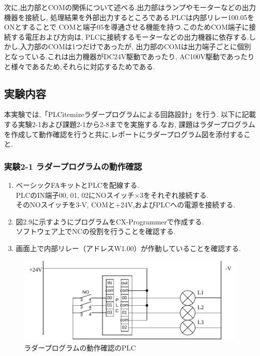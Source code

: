 次に,出力部とCOMの関係について述べる.出力部はランプやモーターなどの出力機器を接続し,
処理結果を外部出力するところである.PLCは内部リレー100.05をONとすることで
COMと端子05を導通させる機能を持つ.このためCOM端子に接続する電圧および方向は,
PLCに接続するモーターなどの出力機器に依存する.しかし,入力部のCOMは1つだけであったが,
出力部のCOMは出力端子ごとに個別となっている.これは出力機器がDC24V駆動であったり,
AC100V駆動であったりと様々であるため,それらに対応するためである.

\subsection{実験内容}

本実験では,「PLCitemizeラダープログラムによる回路設計」を行う.
以下に記載する実験2-1および課題2-1から2-8までを実施する.なお,
課題はラダープログラムを作成して動作確認を行うと共に,レポートにラダープログラム図を添付すること.

\subsubsection*{実験2-1 ラダープログラムの動作確認}
\begin{enumerate}
  \item ベーシックFAキットとPLCを配線する.\\
        PLCのIN端子00, 01, 02にNOスイッチ×3をそれぞれ接続する.\\
        そのNOスイッチを3-V, COMと+24V,およびPLCへの電源を接続する.
  \item 図2.9に示すようにプログラムをCX-Programmerで作成する.\\
        ソフトウェア上でNCの役割を行うことを確認する.
  \item 画面上で内部リレー（アドレスW1.00）が作動していることを確認する.
\end{enumerate}



\begin{figure}[H]
  \centering
  \includegraphics[scale=0.5]{sozai/5.pdf}
  \caption{ラダープログラムの動作確認のPLC}
\end{figure}

